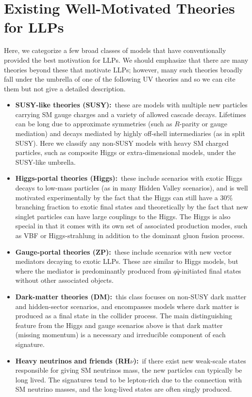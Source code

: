 \section{Existing Well-Motivated Theories for LLPs}
Here, we categorize a few broad classes of models that have conventionally provided the best motivation for LLPs. We should emphasize that there are many theories beyond these that motivate LLPs; however, many such theories broadly fall under the umbrella of one of the following UV theories and so we can cite them but not give a detailed description.
%
\begin{itemize}
\item {\bf SUSY-like theories (SUSY):}~these are models with multiple new particles carrying SM gauge charges and a variety of allowed cascade decays. Lifetimes can be long due to approximate symmetries (such as $R$-parity or gauge mediation) and decays mediated by highly off-shell intermediaries (as in split SUSY).  Here we classify any non-SUSY models with heavy SM charged particles, such as composite Higgs or extra-dimensional models, under the SUSY-like umbrella.
\item {\bf Higgs-portal theories (Higgs):}~these include scenarios with exotic Higgs decays to low-mass particles  (as in many Hidden Valley scenarios), and is well motivated experimentally by the fact that the Higgs can still have a 30\% branching fraction to exotic final states and theoretically by the fact that new singlet particles can have large couplings to the Higgs. The Higgs is also special in that it comes with its own set of associated production modes, such as VBF or Higgs-strahlung in addition to the dominant gluon fusion process.
\item {\bf Gauge-portal theories (ZP):}~these include scenarios with new vector mediators decaying to exotic LLPs. These are similar to Higgs models, but where the mediator is predominantly produced from $q\bar{q}$-initiated final states without other associated objects.
\item {\bf Dark-matter theories (DM):}~this class focuses on non-SUSY dark matter and hidden-sector scenarios, and encompasses models where dark matter is produced as a final state in the collider process. The main distinguishing feature from the Higgs and gauge scenarios above is that dark matter (missing momentum) is a necessary and irreducible component of each signature.
\item {\bf Heavy neutrinos and friends (RH$\nu$):}~if there exist new weak-scale states responsible for giving SM neutrinos mass, the new particles can typically be long lived. The signatures tend to be lepton-rich due to the connection with SM neutrino masses, and the long-lived states are often singly produced.
\end{itemize}
